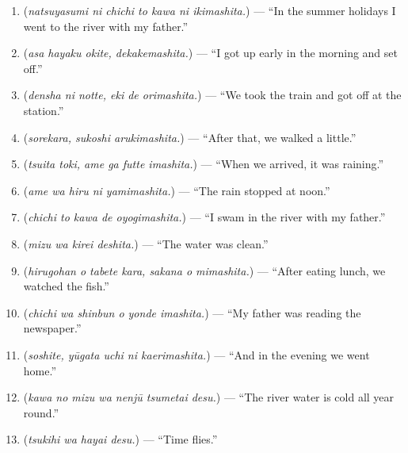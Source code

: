 \begin{tcolorbox}[breakable,skin=enhanced,colback=orange!6,colframe=orange!45!black,boxrule=0.5pt,arc=1mm,left=6pt,right=6pt,top=4pt,bottom=4pt,fonttitle=\bfseries,title={Read this}]
\begin{enumerate}
\raggedright
  \item \textbf{   } (\emph{natsuyasumi ni chichi to kawa ni ikimashita.}) — \textquotedblleft{}In the summer holidays I went to the river with my father.\textquotedblright{}
  \item \textbf{  } (\emph{asa hayaku okite, dekakemashita.}) — \textquotedblleft{}I got up early in the morning and set off.\textquotedblright{}
  \item \textbf{  } (\emph{densha ni notte, eki de orimashita.}) — \textquotedblleft{}We took the train and got off at the station.\textquotedblright{}
  \item \textbf{ } (\emph{sorekara, sukoshi arukimashita.}) — \textquotedblleft{}After that, we walked a little.\textquotedblright{}
  \item \textbf{  } (\emph{tsuita toki, ame ga futte imashita.}) — \textquotedblleft{}When we arrived, it was raining.\textquotedblright{}
  \item \textbf{  } (\emph{ame wa hiru ni yamimashita.}) — \textquotedblleft{}The rain stopped at noon.\textquotedblright{}
  \item \textbf{  } (\emph{chichi to kawa de oyogimashita.}) — \textquotedblleft{}I swam in the river with my father.\textquotedblright{}
  \item \textbf{ } (\emph{mizu wa kirei deshita.}) — \textquotedblleft{}The water was clean.\textquotedblright{}
  \item \textbf{  } (\emph{hirugohan o tabete kara, sakana o mimashita.}) — \textquotedblleft{}After eating lunch, we watched the fish.\textquotedblright{}
  \item \textbf{  } (\emph{chichi wa shinbun o yonde imashita.}) — \textquotedblleft{}My father was reading the newspaper.\textquotedblright{}
  \item \textbf{  } (\emph{soshite, yūgata uchi ni kaerimashita.}) — \textquotedblleft{}And in the evening we went home.\textquotedblright{}
  \item \textbf{   } (\emph{kawa no mizu wa nenjū tsumetai desu.}) — \textquotedblleft{}The river water is cold all year round.\textquotedblright{}
  \item \textbf{ } (\emph{tsukihi wa hayai desu.}) — \textquotedblleft{}Time flies.\textquotedblright{}
\end{enumerate}


\end{tcolorbox}
